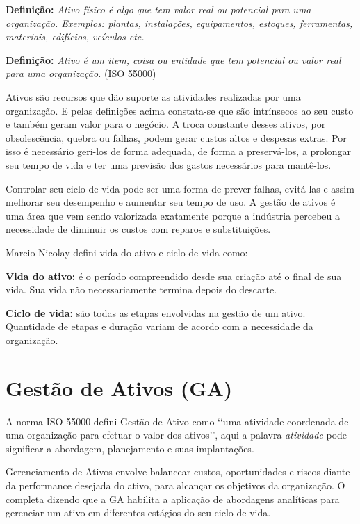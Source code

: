 \textbf{Definição:} \emph{Ativo físico é algo que tem valor real ou potencial para uma organização.
Exemplos: plantas, instalações, equipamentos, estoques, ferramentas, materiais, edifícios, veículos etc.} \cite{nicolay2015}

\textbf{Definição:} \emph{Ativo é um item, coisa ou entidade que tem potencial ou valor real para uma organização.} (ISO 55000)

Ativos são recursos que dão suporte as atividades realizadas por uma organização. E pelas definições acima constata-se que são intrínsecos ao seu custo e também geram valor para o negócio. A troca constante desses ativos, por obsolescência, quebra ou falhas, podem gerar custos altos e despesas extras. Por isso é necessário geri-los de forma adequada, de forma a preservá-los, a prolongar seu tempo de vida e ter uma previsão dos gastos necessários para mantê-los. 

Controlar seu ciclo de vida pode ser uma forma de prever falhas, evitá-las e assim melhorar seu desempenho e aumentar seu tempo de uso. A gestão de ativos é uma área que vem sendo valorizada exatamente porque a indústria percebeu a necessidade de diminuir os custos com reparos e substituições.

Marcio Nicolay \cite{nicolay2015} defini vida do ativo e ciclo de vida como:

\textbf{Vida do ativo:} é o período compreendido desde sua criação até o final de sua vida. Sua vida não necessariamente termina depois do descarte.

\textbf{Ciclo de vida:} são todas as etapas envolvidas na gestão de um ativo. Quantidade de etapas e duração variam de acordo com a necessidade da organização.


\section{Gestão de Ativos (GA)}

A norma ISO 55000 defini Gestão de Ativo como \lq\lq uma atividade coordenada de uma organização para efetuar o valor dos ativos\rq\rq, aqui a palavra \emph{atividade} pode significar a abordagem, planejamento e suas implantações. 

Gerenciamento de Ativos envolve balancear custos, oportunidades e riscos diante da performance desejada do ativo, para alcançar os objetivos da organização. O \cite{iam} completa dizendo que a GA habilita a aplicação de abordagens analíticas para gerenciar um ativo em diferentes estágios do seu ciclo de vida.

